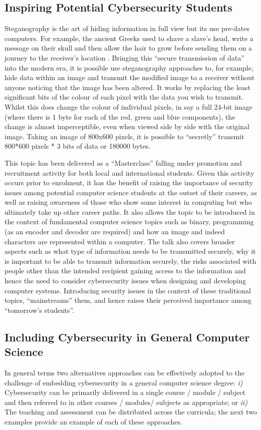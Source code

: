 \documentclass[conference]{IEEEtran}
\begin{document}
\subsection{Inspiring Potential Cybersecurity Students}\label{sec:third} %
Steganography is the art of hiding information in full view but its use pre-dates computers.  For example, the ancient Greeks used to shave a slave’s head, write a message on their skull and then allow the hair to grow before sending them on a journey to the receiver’s location \cite{Herodotus440}.  Bringing this ``secure transmission of data'' into the modern era, it is possible use steganography approaches to, for example, hide data within an image and transmit the modified image to a receiver without anyone noticing that the image has been altered.  It works by replacing the least significant bits of the colour of each pixel with the data you wish to transmit.  Whilst this does change the colour of individual pixels, in say a full 24-bit image (where there is 1 byte for each of the red, green and blue components), the change is almost imperceptible, even when viewed side by side with the original image.  Taking an image of 800x600 pixels, it is possible to ``secretly'' transmit 800*600 pixels * 3 bits of data or 180000 bytes.

This topic has been delivered as a ``Masterclass'' falling under promotion and recruitment activity for both local and international students.  Given this activity occurs prior to enrolment, it has the benefit of raising the importance of security issues among potential computer science students at the outset of their careers, as well as raising awareness of those who show some interest in computing but who ultimately take up other career paths.  It also allows the topic to be introduced in the context of fundamental computer science topics such as binary, programming (as an encoder and decoder are required) and how an image and indeed characters are represented within a computer.  The talk also covers broader aspects such as what type of information needs to be transmitted securely, why it is important to be able to transmit information securely, the risks associated with people other than the intended recipient gaining access to the information and hence the need to consider cybersecurity issues when designing and developing computer systems.  Introducing security issues in the context of these traditional topics, ``mainstreams'' them, and hence raises their perceived importance among ``tomorrow’s students''.

\subsection{Including Cybersecurity in General Computer Science}
In general terms two alternatives approaches can be effectively
adopted to the challenge of embedding cybersecurity in a general
computer science degree: {\emph{i)}} Cybersecurity can be primarily
delivered in a single course / module / subject and then referred to
in other courses / modules/ subjects as appropriate; or {\emph{ii)}}
The teaching and assessment can be distributed across the curricula;
the next two examples provide an example of each of these approaches.
  
\end{document}
